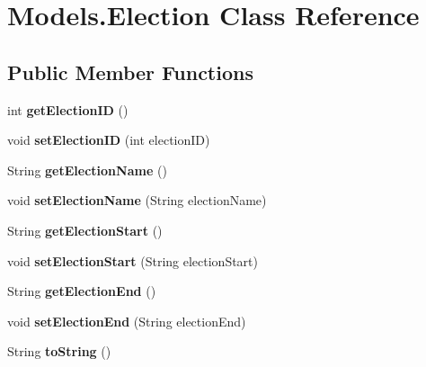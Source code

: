 \hypertarget{class_models_1_1_election}{}\section{Models.\+Election Class Reference}
\label{class_models_1_1_election}
\subsection*{Public Member Functions}
\begin{DoxyCompactItemize}
\item 
\mbox{\label{class_models_1_1_election_abff6a09a98742c6f3e771561aec0c2fc}} 
int {\bfseries get\+Election\+ID} ()
\item 
\mbox{\label{class_models_1_1_election_a36c556fd89f60c09e7900f7190d4df6e}} 
void {\bfseries set\+Election\+ID} (int election\+ID)
\item 
\mbox{\label{class_models_1_1_election_a8038f19b8a6d5ed8b8f1027184ec5cfe}} 
String {\bfseries get\+Election\+Name} ()
\item 
\mbox{\label{class_models_1_1_election_a0955df5898e26bbe1541f37057f0aee7}} 
void {\bfseries set\+Election\+Name} (String election\+Name)
\item 
\mbox{\label{class_models_1_1_election_afa08ef06acebf3566c14f0c035888926}} 
String {\bfseries get\+Election\+Start} ()
\item 
\mbox{\label{class_models_1_1_election_adda3195430dabc3e7cb4c59c5ef483a3}} 
void {\bfseries set\+Election\+Start} (String election\+Start)
\item 
\mbox{\label{class_models_1_1_election_a66cd2b6ee10b33ba09e201ab8713d0ea}} 
String {\bfseries get\+Election\+End} ()
\item 
\mbox{\label{class_models_1_1_election_a49d95141debc50ac89f1c1959088d6ca}} 
void {\bfseries set\+Election\+End} (String election\+End)
\item 
\mbox{\label{class_models_1_1_election_aeea1124efd68654a1900af46be71f645}} 
String {\bfseries to\+String} ()
\end{DoxyCompactItemize}
